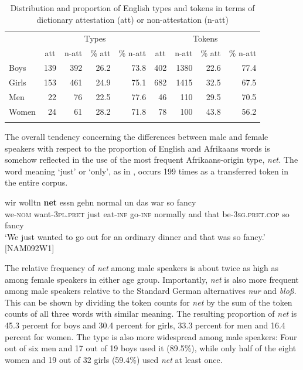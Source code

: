\documentclass[output=paper]{langsci/langscibook}
\begin{document}
  
\begin{table}
\begin{tabular}{lrrrrrrrr}
\lsptoprule
& \multicolumn{4}{c}{Types} & \multicolumn{4}{c}{Tokens}\\\cmidrule(lr){2-5}\cmidrule(lr){6-9}
& \multicolumn{1}{c}{att} & \multicolumn{1}{c}{n-att} & \multicolumn{1}{c}{\% att} & \multicolumn{1}{c}{\% n-att} & \multicolumn{1}{c}{att} & \multicolumn{1}{c}{n-att} & \multicolumn{1}{c}{\% att} & \multicolumn{1}{c}{\% n-att}\\
\midrule
Boys & 139 & 392 & 26.2 & 73.8 & 402 & 1380 & 22.6 & 77.4\\
Girls & 153 & 461 & 24.9 & 75.1 & 682 & 1415 & 32.5 & 67.5\\
Men & 22 & 76 & 22.5 & 77.6 & 46 & 110 & 29.5 & 70.5\\
Women & 24 & 61 & 28.2 & 71.8 & 78 & 100 & 43.8 & 56.2\\
\lspbottomrule
\end{tabular}
\caption{Distribution and proportion of English types and tokens in terms of dictionary attestation (att) or non-attestation (n-att)\label{tab:bracke:8}}
\end{table}  

The overall tendency concerning the differences between male and female speakers with respect to the proportion of English and Afrikaans words is somehow reflected in the use of the most frequent Afrikaans-origin type, \textit{net.} The word meaning ‘just’ or ‘only’, as in , occurs 199 times as a transferred token in the entire corpus.

\ea
\label{ex:bracke:8}
\gll wir wolltn \textbf{net} essn gehn normal un das war so fancy\\
     we-\textsc{nom} want-\textsc{3pl.pret} just eat-\textsc{inf} go-\textsc{inf} normally and that be-\textsc{3sg.pret.cop} so fancy\\
\glt `We just wanted to go out for an ordinary dinner and that was so fancy.' {[}NAM092W1{]}
\z

The relative frequency of \textit{net} among male speakers is about twice as high as among female speakers in either age group. Importantly, \textit{net} is also more frequent among male speakers relative to the Standard German alternatives \textit{nur} and \textit{bloß.} This can be shown by dividing the token counts for \textit{net} by the sum of the token counts of all three words with similar meaning. The resulting proportion of \textit{net} is 45.3 percent for boys and 30.4 percent for girls, 33.3 percent for men and 16.4 percent for women. The type is also more widespread among male speakers: Four out of six men and 17 out of 19 boys used it (89.5\%), while only half of the eight women and 19 out of 32 girls (59.4\%) used \textit{net} at least once.
\end{document}
